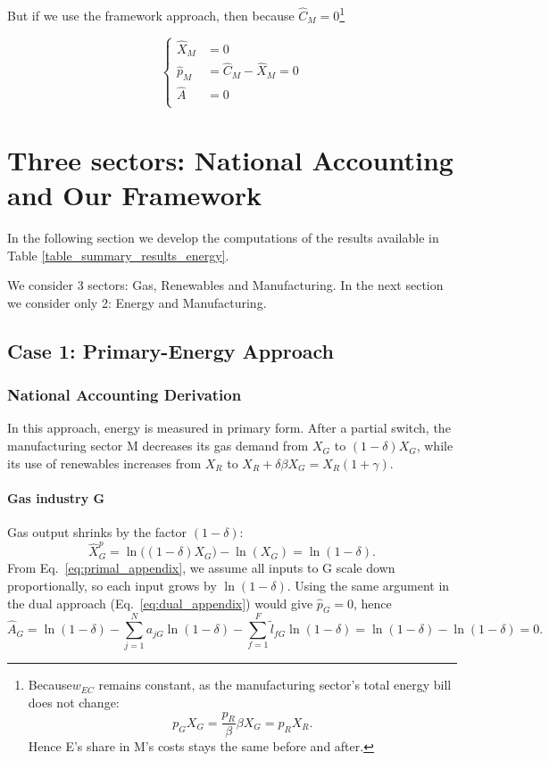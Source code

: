 \documentclass[11pt]{article}
\begin{document}
But if we use the framework approach, then because $\hat{C}_M=0$\footnote{Because$w_{EC}$  remains constant, as the manufacturing sector's total energy bill does not change: 
\begin{equation*}
     p_GX_G 
         = \frac{p_R}{\beta }\beta X_G 
         = p_RX_R.
\end{equation*} Hence E's share in M's costs stays the same before and after.
}

\[
\left\{
\begin{aligned}
\hat{X}_M&=0\\
\hat{p}_M &= \hat{C}_M-\hat{X}_M= 0\\
\hat{A}&=0\\
\end{aligned}
\right.
\]

\newpage





\section{Three sectors: National Accounting and Our Framework}


In the following section we develop the computations of the results available in Table \ref{table_summary_results_energy}. 

We consider 3 sectors: Gas, Renewables and Manufacturing. In the next section we consider only 2: Energy and Manufacturing.

\subsection{Case 1: Primary-Energy Approach}
\label{subappendix_primary_energy}
\subsubsection{National Accounting Derivation}

In this approach, energy is measured in primary form. After a partial switch, the manufacturing sector M decreases its gas demand from $X_G$ to $(1-\delta)X_G$, while its use of renewables increases from $X_R$ to $X_R + \delta \beta X_G = X_R(1+\gamma)$.

\paragraph{Gas industry G}
Gas output shrinks by the factor $(1-\delta)$:
\[
    \hat{X}_G^p
= \ln\bigl((1-\delta) X_G\bigr)  -  \ln(X_G)
= \ln(1-\delta).
\]
From Eq.~\ref{eq:primal_appendix}, we assume all inputs to G scale down proportionally, so each input grows by $\ln(1-\delta)$. Using the same argument in the dual approach (Eq.~\ref{eq:dual_appendix}) would give $\hat{p}_G=0$, hence
\[
    \hat{A}_G
= \ln(1-\delta)
  - \sum_{j=1}^N a_{jG}\ln(1-\delta)
  - \sum_{f=1}^F \tilde{l}_{fG}\ln(1-\delta)
= \ln(1-\delta)  -  \ln(1-\delta)
= 0.
\]
\end{document}

